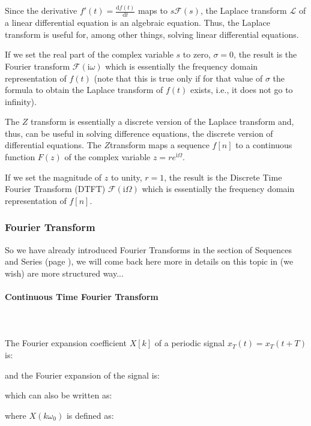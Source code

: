 	Since the derivative $f'(t)=\frac{\mathrm{d}f(t)}{\mathrm{d}t}$ maps to $s\mathcal{F}(s)$, the Laplace transform $\mathcal{L}$ of a linear differential equation is an algebraic equation. Thus, the Laplace transform is useful for, among other things, solving linear differential equations.
	
	If we set the real part of the complex variable $s$ to zero, $\sigma=0$, the result is the Fourier transform $\mathcal{F}(\mathrm{i}\omega)$ which is essentially the frequency domain representation of $f(t)$ (note that this is true only if for that value of $\sigma$ the formula to obtain the Laplace transform of $f(t)$ exists, i.e., it does not go to infinity).
	
	The $Z$ transform is essentially a discrete version of the Laplace transform and, thus, can be useful in solving difference equations, the discrete version of differential equations. The $Z $transform maps a sequence $f[n]$ to a continuous function $F(z)$ of the complex variable $z=re^{\mathrm{i}\Omega}$.
	
	If we set the magnitude of $z$ to unity, $r=1$, the result is the Discrete Time Fourier Transform (DTFT) $\mathcal{F}(\mathrm{i}\Omega)$ which is essentially the frequency domain representation of $f[n]$.
	
	\subsubsection{Fourier Transform}
	So we have already introduced Fourier Transforms in the section of Sequences and Series (page \pageref{fourier transform}), we will come back here more in details on this topic in (we wish) are more structured way...
	
	\paragraph{Continuous Time Fourier Transform}\mbox{}\\\\	
	The Fourier expansion coefficient $X[k]$ of a periodic  signal $x_T(t)=x_T(t+T)$ is:
	
	and the Fourier expansion of the signal is:
	
	which can also be written as:
	
	where $X(k\omega_0)$ is defined as:
	
